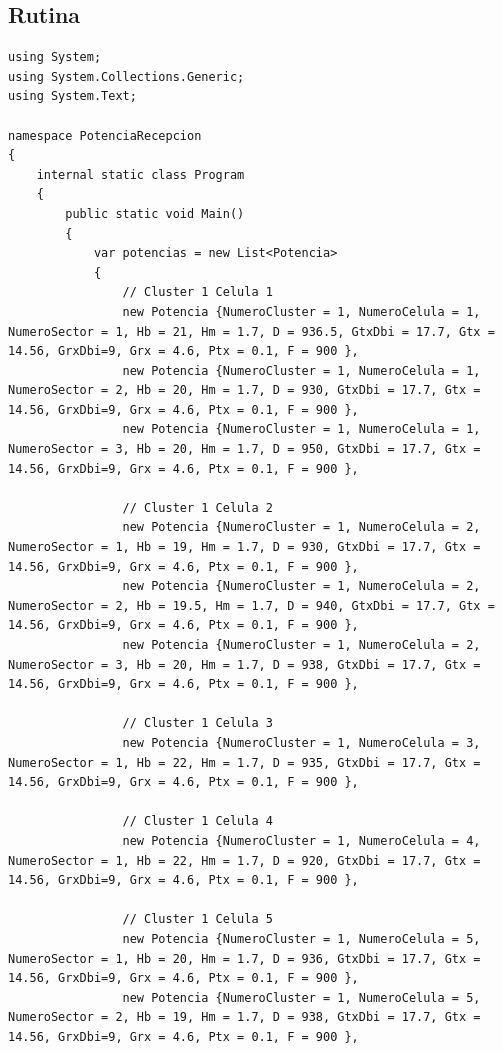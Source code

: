 \documentclass[11pt,letterpaper]{article}
\begin{document}
\subsection{Rutina}
\begin{lstlisting}[style=CStyle]
using System;
using System.Collections.Generic;
using System.Text;

namespace PotenciaRecepcion
{
    internal static class Program
    {
        public static void Main()
        {
            var potencias = new List<Potencia>
            {
                // Cluster 1 Celula 1
                new Potencia {NumeroCluster = 1, NumeroCelula = 1, NumeroSector = 1, Hb = 21, Hm = 1.7, D = 936.5, GtxDbi = 17.7, Gtx = 14.56, GrxDbi=9, Grx = 4.6, Ptx = 0.1, F = 900 },
                new Potencia {NumeroCluster = 1, NumeroCelula = 1, NumeroSector = 2, Hb = 20, Hm = 1.7, D = 930, GtxDbi = 17.7, Gtx = 14.56, GrxDbi=9, Grx = 4.6, Ptx = 0.1, F = 900 },
                new Potencia {NumeroCluster = 1, NumeroCelula = 1, NumeroSector = 3, Hb = 20, Hm = 1.7, D = 950, GtxDbi = 17.7, Gtx = 14.56, GrxDbi=9, Grx = 4.6, Ptx = 0.1, F = 900 },

                // Cluster 1 Celula 2
                new Potencia {NumeroCluster = 1, NumeroCelula = 2, NumeroSector = 1, Hb = 19, Hm = 1.7, D = 930, GtxDbi = 17.7, Gtx = 14.56, GrxDbi=9, Grx = 4.6, Ptx = 0.1, F = 900 },
                new Potencia {NumeroCluster = 1, NumeroCelula = 2, NumeroSector = 2, Hb = 19.5, Hm = 1.7, D = 940, GtxDbi = 17.7, Gtx = 14.56, GrxDbi=9, Grx = 4.6, Ptx = 0.1, F = 900 },
                new Potencia {NumeroCluster = 1, NumeroCelula = 2, NumeroSector = 3, Hb = 20, Hm = 1.7, D = 938, GtxDbi = 17.7, Gtx = 14.56, GrxDbi=9, Grx = 4.6, Ptx = 0.1, F = 900 },

                // Cluster 1 Celula 3
                new Potencia {NumeroCluster = 1, NumeroCelula = 3, NumeroSector = 1, Hb = 22, Hm = 1.7, D = 935, GtxDbi = 17.7, Gtx = 14.56, GrxDbi=9, Grx = 4.6, Ptx = 0.1, F = 900 },

                // Cluster 1 Celula 4
                new Potencia {NumeroCluster = 1, NumeroCelula = 4, NumeroSector = 1, Hb = 22, Hm = 1.7, D = 920, GtxDbi = 17.7, Gtx = 14.56, GrxDbi=9, Grx = 4.6, Ptx = 0.1, F = 900 },

                // Cluster 1 Celula 5
                new Potencia {NumeroCluster = 1, NumeroCelula = 5, NumeroSector = 1, Hb = 20, Hm = 1.7, D = 936, GtxDbi = 17.7, Gtx = 14.56, GrxDbi=9, Grx = 4.6, Ptx = 0.1, F = 900 },
                new Potencia {NumeroCluster = 1, NumeroCelula = 5, NumeroSector = 2, Hb = 19, Hm = 1.7, D = 938, GtxDbi = 17.7, Gtx = 14.56, GrxDbi=9, Grx = 4.6, Ptx = 0.1, F = 900 },


\end{lstlisting}
\end{document}
